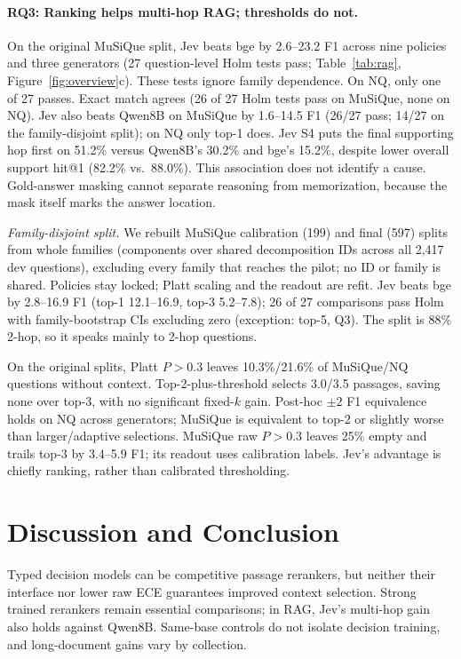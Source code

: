 \documentclass[sigconf,nonacm]{acmart}
\begin{document}
\paragraph{RQ3: Ranking helps multi-hop RAG; thresholds do not.}
On the original MuSiQue split, Jev beats bge by 2.6--23.2 F1 across nine policies and three generators (27 question-level Holm tests pass; Table~\ref{tab:rag}, Figure~\ref{fig:overview}c). These tests ignore family dependence. On NQ, only one of 27 passes. Exact match agrees (26 of 27 Holm tests pass on MuSiQue, none on NQ). Jev also beats Qwen8B on MuSiQue by 1.6--14.5 F1 (26/27 pass; 14/27 on the family-disjoint split); on NQ only top-1 does. Jev S4 puts the final supporting hop first on 51.2\% versus Qwen8B's 30.2\% and bge's 15.2\%, despite lower overall support hit@1 (82.2\% vs.\ 88.0\%). This association does not identify a cause. Gold-answer masking cannot separate reasoning from memorization, because the mask itself marks the answer location.

\emph{Family-disjoint split.} We rebuilt MuSiQue calibration (199) and final (597) splits from whole families (components over shared decomposition IDs across all 2,417 dev questions), excluding every family that reaches the pilot; no ID or family is shared. Policies stay locked; Platt scaling and the readout are refit. Jev beats bge by 2.8--16.9 F1 (top-1 12.1--16.9, top-3 5.2--7.8); 26 of 27 comparisons pass Holm with family-bootstrap CIs excluding zero (exception: top-5, Q3). The split is 88\% 2-hop, so it speaks mainly to 2-hop questions.

On the original splits, Platt $P>0.3$ leaves 10.3\%/21.6\% of MuSiQue/NQ questions without context. Top-2-plus-threshold selects 3.0/3.5 passages, saving none over top-3, with no significant fixed-$k$ gain. Post-hoc $\pm2$ F1 equivalence holds on NQ across generators; MuSiQue is equivalent to top-2 or slightly worse than larger/adaptive selections. MuSiQue raw $P>0.3$ leaves 25\% empty and trails top-3 by 3.4--5.9 F1; its readout uses calibration labels. Jev's advantage is chiefly ranking, rather than calibrated thresholding.

\section{Discussion and Conclusion}
Typed decision models can be competitive passage rerankers, but neither their interface nor lower raw ECE guarantees improved context selection. Strong trained rerankers remain essential comparisons; in RAG, Jev's multi-hop gain also holds against Qwen8B. Same-base controls do not isolate decision training, and long-document gains vary by collection.
\end{document}
